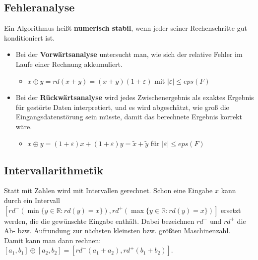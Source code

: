 \documentclass[12pt,a4paper]{article}
\theoremstyle{plain}
\newcommand{\R}{\mathbb{R}}
\numberwithin{equation}{section}
\begin{document}
\subsection{Fehleranalyse}
Ein Algorithmus heißt \textbf{numerisch stabil}, wenn jeder seiner Rechenschritte gut konditioniert ist.
\begin{itemize}
\item Bei der \textbf{Vorwärtsanalyse} untersucht man, wie sich der relative Fehler im Laufe einer Rechnung akkumuliert.
\begin{itemize}
\item$x \oplus y = rd(x+y)=(x+y)(1+\varepsilon)$ mit $|\varepsilon|\leq eps(F)$
\end{itemize}
\item Bei der \textbf{Rückwärtsanalyse} wird jedes Zwischenergebnis als exaktes Ergebnis für gestörte Daten interpretiert, und es wird abgeschätzt, wie groß die Eingangsdatenstörung sein müsste, damit das berechnete Ergebnis korrekt wäre.
\begin{itemize}
\item $x\oplus y=(1+\varepsilon)x+(1+\varepsilon)y=\tilde{x}+\tilde{y}$ für $|\varepsilon|\leq eps(F)$
\end{itemize}
\end{itemize}
\subsection{Intervallarithmetik}
Statt mit Zahlen wird mit Intervallen gerechnet. Schon eine Eingabe $x$ kann durch ein Intervall $\left[rd^-(\min\{y\in\R:rd(y)=x\}),rd^+(\max\{y\in\R:rd(y)=x\})\right]$ ersetzt werden, die die gewünschte Eingabe enthält. Dabei bezeichnen $rd^-$ und $rd^+$ die Ab- bzw. Aufrundung zur nächsten kleinsten bzw. größten Maschinenzahl.\\ Damit kann man dann rechnen: $\left[a_1, b_1\right] \oplus \left[a_2,b_2\right]=\left[rd^-(a_1+a_2),rd^+(b_1+b_2)\right]$.
\end{document}
